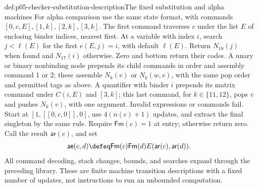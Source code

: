 \begin{hbdefinition}{def:p05-checker-substitution-description}{The fixed substitution and alpha machines}
For alpha comparison use the same state format, with commands
\([0,c,E],[1,k],[2,k],[3,k]\).  The first command traverses \(c\)
under the list \(E\) of enclosing binder indices, nearest first.  At a
variable with index \(i\), search \(j<\ell(E)\) for the first
\(e(E,j)=i\), with default \(\ell(E)\).  Return \(N_{18}(j)\)
when found and \(N_{17}(i)\) otherwise.  Zero and bottom return their codes.
A unary or binary nonbinding node prepends its child commands in order and
assembly command 1 or 2; these assemble \(N_k(v)\) or \(N_k(w,v)\),
with the same pop order and permitted tags as above.  A quantifier with binder
\(i\) prepends its matrix command under \(C(i,E)\) and \([3,k]\);
this last command, for \(k\in\{11,12\}\), pops \(v\) and pushes
\(N_k(v)\), with one argument.  Invalid expressions or commands fail.
Start at \([1,[[0,c,0]],0]\), use \(4(n(c)+1)\) updates, and extract
the final singleton by the same rule.  Require \(\mathsf{Fm}(c)=1\)
at entry; otherwise return zero.  Call the result \(\mathsf{ar}(c)\), and set
\[
 \mathsf{ae}(c,d)\defeq
          \mathsf{Fm}(c)\mathsf{Fm}(d)E(\mathsf{ar}(c),\mathsf{ar}(d)).
\]
All command decoding, stack changes, bounds, and searches expand through the
preceding library.  These are finite machine transition descriptions with a
fixed number of updates, not instructions to run an unbounded computation.
\end{hbdefinition}


